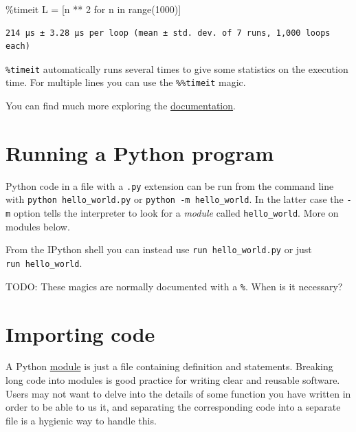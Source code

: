\documentclass[
  letterpaper,
  DIV=11,
  numbers=noendperiod]{scrreprt}
\newenvironment{Shaded}{\begin{snugshade}}{\end{snugshade}}
\newcommand{\BuiltInTok}[1]{\textcolor[rgb]{0.00,0.23,0.31}{#1}}
\newcommand{\ControlFlowTok}[1]{\textcolor[rgb]{0.00,0.23,0.31}{#1}}
\newcommand{\DecValTok}[1]{\textcolor[rgb]{0.68,0.00,0.00}{#1}}
\newcommand{\KeywordTok}[1]{\textcolor[rgb]{0.00,0.23,0.31}{#1}}
\newcommand{\NormalTok}[1]{\textcolor[rgb]{0.00,0.23,0.31}{#1}}
\newcommand{\OperatorTok}[1]{\textcolor[rgb]{0.37,0.37,0.37}{#1}}
\theoremstyle{definition}
\theoremstyle{remark}
\begin{document}
\begin{Shaded}
\begin{Highlighting}[]
\OperatorTok{\%}\NormalTok{timeit L }\OperatorTok{=}\NormalTok{ [n }\OperatorTok{**} \DecValTok{2} \ControlFlowTok{for}\NormalTok{ n }\KeywordTok{in} \BuiltInTok{range}\NormalTok{(}\DecValTok{1000}\NormalTok{)]}
\end{Highlighting}
\end{Shaded}

\begin{verbatim}
214 µs ± 3.28 µs per loop (mean ± std. dev. of 7 runs, 1,000 loops each)
\end{verbatim}

\texttt{\%timeit} automatically runs several times to give some
statistics on the execution time. For multiple lines you can use the
\texttt{\%\%timeit} magic.

You can find much more exploring the
\href{https://ipython.readthedocs.io/en/stable/}{documentation}.

\hypertarget{running-a-python-program}{%
\section{Running a Python program}\label{running-a-python-program}}

Python code in a file with a \texttt{.py} extension can be run from the
command line with \texttt{python\ hello\_world.py} or
\texttt{python\ -m\ hello\_world}. In the latter case the \texttt{-m}
option tells the interpreter to look for a \emph{module} called
\texttt{hello\_world}. More on modules below.

From the IPython shell you can instead use \texttt{run\ hello\_world.py}
or just \texttt{run\ hello\_world}.

TODO: These magics are normally documented with a \texttt{\%}. When is
it necessary?

\hypertarget{importing-code}{%
\section{Importing code}\label{importing-code}}

A Python \href{https://docs.python.org/3/tutorial/modules.html}{module}
is just a file containing definition and statements. Breaking long code
into modules is good practice for writing clear and reusable software.
Users may not want to delve into the details of some function you have
written in order to be able to us it, and separating the corresponding
code into a separate file is a hygienic way to handle this.
\end{document}
